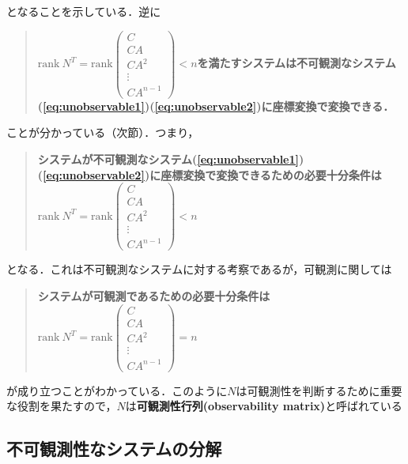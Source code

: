 となることを示している．逆に
\begin{quote}
   {\bf    $\mbox{rank}\ N^T 
   = \mbox{rank} 
	  \left(\begin{array}{c}
	         C        \\
		 C A      \\
		 C A^2    \\
		 \vdots   \\
		 C A^{n-1}
		\end{array}\right)
    < n$を満たすシステムは不可観測なシステム(\ref{eq:unobservable1})(\ref{eq:unobservable2})に座標変換で変換できる．}
\end{quote}
ことが分かっている（次節）．つまり，
\begin{quote}
   {\bf システムが不可観測なシステム(\ref{eq:unobservable1})(\ref{eq:unobservable2})に座標変換で変換できるための必要十分条件は
   $\mbox{rank}\ N^T 
   = \mbox{rank} 
	  \left(\begin{array}{c}
	         C        \\
		 C A      \\
		 C A^2    \\
		 \vdots   \\
		 C A^{n-1}
		\end{array}\right)
    < n$}
\end{quote}
となる．これは不可観測なシステムに対する考察であるが，可観測に関しては
\begin{quote}
	{\bf システムが可観測であるための必要十分条件は
	$\mbox{rank}\ N^T 
	= \mbox{rank} 
	  \left(\begin{array}{c}
	         C        \\
		 C A      \\
		 C A^2    \\
		 \vdots   \\
		 C A^{n-1}
		\end{array}\right)
	= n$}
\end{quote}
が成り立つことがわかっている．このように$N$は可観測性を判断するために重要な役割を果たすので，$N$は{\bf 可観測性行列(observability matrix)}と呼ばれている



\subsection{不可観測性なシステムの分解 \label{sec:observability_decomp}}

